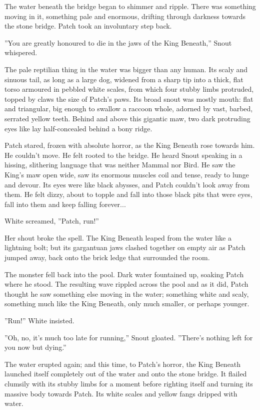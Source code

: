 \documentclass[11pt]{article}
\begin{document}
 The water beneath the bridge began to shimmer and ripple. There was something moving in it, something pale and enormous, drifting through darkness towards the stone bridge. Patch took an involuntary step back.\par
 ''You are greatly honoured to die in the jaws of the King Beneath,'' Snout whispered.\par
 The pale reptilian thing in the water was bigger than any human. Its scaly and sinuous tail, as long as a large dog, widened from a sharp tip into a thick, flat torso armoured in pebbled white scales, from which four stubby limbs protruded, topped by claws the size of Patch's paws. Its broad snout was mostly mouth: flat and triangular, big enough to swallow a raccoon whole, adorned by vast, barbed, serrated yellow teeth. Behind and above this gigantic maw, two dark protruding eyes like lay half-concealed behind a bony ridge.\par
Patch stared, frozen with absolute horror, as the King Beneath rose towards him. He couldn't move. He felt rooted to the bridge. He heard Snout speaking in a hissing, slithering language that was neither Mammal nor Bird. He saw the King's maw open wide, saw its enormous muscles coil and tense, ready to lunge and devour. Its eyes were like black abysses, and Patch couldn't look away from them. He felt dizzy, about to topple and fall into those black pits that were eyes, fall into them and keep falling forever...\par
White screamed, ''Patch, run!''\par
Her shout broke the spell. The King Beneath leaped from the water like a lightning bolt; but its gargantuan jaws clashed together on empty air as Patch jumped away, back onto the brick ledge that surrounded the room.\par
The monster fell back into the pool. Dark water fountained up, soaking Patch where he stood. The resulting wave rippled across the pool %
 and as it did, Patch thought he saw something else moving in the water; something white and scaly, something much like the King Beneath, only much smaller, or perhaps younger.\par
 ''Run!'' White insisted.\par
 ''Oh, no, it's much too late for running,'' Snout gloated. ''There's nothing left for you now but dying.''\par
 The water erupted again; and this time, to Patch's horror, the King Beneath launched itself completely out of the water and onto the stone bridge. It flailed clumsily with its stubby limbs for a moment before righting itself and turning its massive body towards Patch. Its white scales and yellow fangs dripped with water.\par
\end{document}
